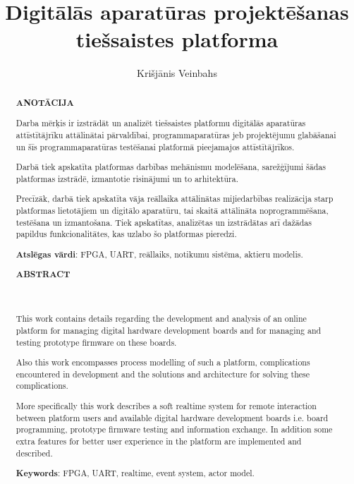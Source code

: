 \documentclass{LU}
\title{Digitālās aparatūras projektēšanas tiešsaistes platforma}
\author{Krišjānis Veinbahs}
\begin{document}
\maketitle

\renewcommand{\abstractname}{}
\begin{abstract}
    \begin{center}
    \Large\textbf{ANOTĀCIJA}\\
    \end{center}
    \vspace{1.5\baselineskip}

    Darba mērķis ir izstrādāt un analizēt tiešsaistes platformu digitālās aparatūras attīstītājrīku
    attālinātai pārvaldībai, programmaparatūras jeb projektējumu glabāšanai un šīs programmaparatūras testēšanai
    platformā pieejamajos attīstītājrīkos.

    Darbā tiek apskatīta platformas darbības mehānismu modelēšana, sarežģījumi šādas
    platformas izstrādē, izmantotie risinājumi un to arhitektūra.

    Precīzāk, darbā tiek apskatīta vāja reāllaika attālinātas mijiedarbības
    realizācija starp platformas lietotājiem un digitālo aparatūru, tai skaitā attālināta
    noprogrammēšana, testēšana un izmantošana. Tiek apskatītas, analizētas un
    izstrādātas arī dažādas papildus funkcionalitātes, kas uzlabo šo platformas pieredzi.

    \textbf{Atslēgas vārdi}: FPGA, UART, reāllaiks, notikumu sistēma, aktieru modelis.
\end{abstract}
 

\renewcommand{\abstractname}{}
\begin{abstract}
    \begin{center}
    \Large\textbf{ABSTRACT}\\
    \Large{}\\
    \Large{}\\
    \end{center}
    \vspace{1.5\baselineskip}

    This work contains details regarding the development and analysis of an online platform for
    managing digital hardware development boards and for managing and testing prototype firmware on these boards.

    Also this work encompasses process modelling of such a platform, complications encountered in development and
    the solutions and architecture for solving these complications.  

    More specifically this work describes a soft realtime system for remote interaction between platform users and 
    available digital hardware development boards i.e. board programming, prototype firmware testing and information exchange.
    In addition some extra features for better user experience in the platform are implemented and described.  

    \textbf{Keywords}: FPGA, UART, realtime, event system, actor model.
\end{abstract}
\end{document}
